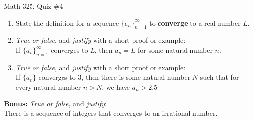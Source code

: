 \documentclass[12pt]{amsart}
\begin{document}
	
	\thispagestyle{empty}
	
	\begin{center}
		\Large{Math 325. Quiz \#4 }\\

	\end{center}
	
	
	
	\bigskip
	
	\begin{enumerate}
	
	\item State the definition for a sequence $\{a_n\}_{n=1}^\infty$ to \textbf{converge} to a real number $L$.
	
	\vfill\vfill
	
	\item  \emph{True or false}, and \emph{justify} with a short proof or example:\\
If $\{a_n\}_{n=1}^\infty$ converges to $L$, then $a_n=L$ for some natural number $n$.


\vfill\vfill\vfill 


\item  \emph{True or false}, and \emph{justify} with a short proof or example:\\
If $\{a_n\}$ converges to $3$, then there is some natural number $N$ such that for every natural number $n>N$, we have $a_n>2.5$.
		
\vfill\vfill\vfill





\end{enumerate}

\newpage

\textbf{Bonus:} \emph{True or false}, and \emph{justify}:\\
There is a sequence of integers that converges to an irrational number.

	
	
\end{document}
